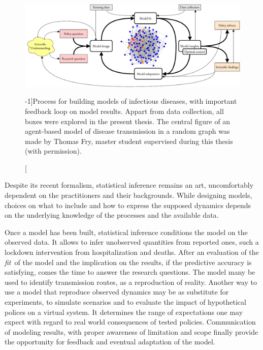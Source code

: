 \begin{figure}\centering
  \includegraphics{fig/modeling_cycle_new}
  \caption[Process for infectious disease modeling][-1\baselineskip]{Process for building models of infectious diseases, with important feedback loop on model results. Appart from data collection, all boxes were explored in the present thesis. The central figure of an agent-based model of disease transmission in a random graph was made by Thomas Fry,  master student supervised during this thesis (with permission).}\label{fig:modeling}
\end{figure}

Despite its recent formalism, statistical inference remains an art, uncomfortably dependent on the practitioners and their backgrounds. While designing models, choices on what to include and how to express the supposed dynamics depends on the underlying knowledge of the processes and the available data. 

Once a model has been built, statistical inference conditions the model on the observed data. It allows to infer unobserved quantities from reported ones, such a lockdown intervention from hospitalization and deaths. After an evaluation of the \textit{fit} of the model and the implication on the results, if the predictive accuracy is satisfying, comes the time to answer the research questions. The model many be used to identify transmission routes, as a reproduction of reality. Another way to use a model that reproduce observed dynamics may be as substitute for experiments, to simulate scenarios and to evaluate the impact of hypothetical polices on a virtual system. It determines the range of expectations one may expect with regard to real world consequences of tested policies. Communication of modeling results, with proper awareness of limitation and scope finally provide the opportunity for feedback and eventual adaptation of the model\cite{Heesterbeek:ModelingInfectiousDisease:2015}.

